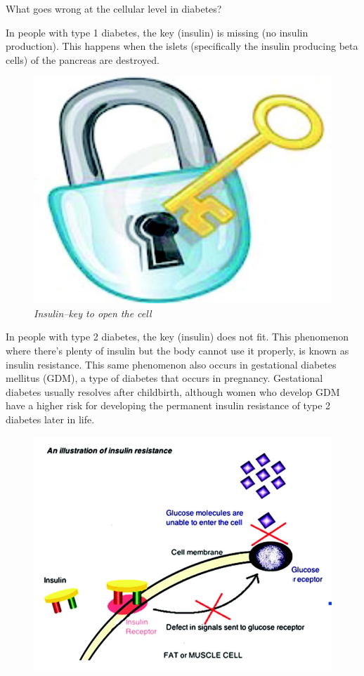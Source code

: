 What goes wrong at the cellular level in diabetes?

In people with type 1 diabetes, the key (insulin) is missing (no insulin production). This happens when the islets (specifically the insulin producing beta cells) of the pancreas are destroyed.

\begin{figure}
\includegraphics{images/020.jpg}
\caption{\textit{Insulin–key to open the cell}}
\end{figure}

In people with type 2 diabetes, the key (insulin) does not fit. This phenomenon where there’s plenty of insulin but the body cannot use it properly, is known as insulin resistance. This same phenomenon also occurs in gestational diabetes mellitus (GDM), a type of diabetes that occurs in pregnancy. Gestational diabetes usually resolves after childbirth, although women who develop GDM have a higher risk for developing the permanent insulin resistance of type 2 diabetes later in life.

\begin{figure}
\includegraphics{images/021.jpg}
\end{figure}


